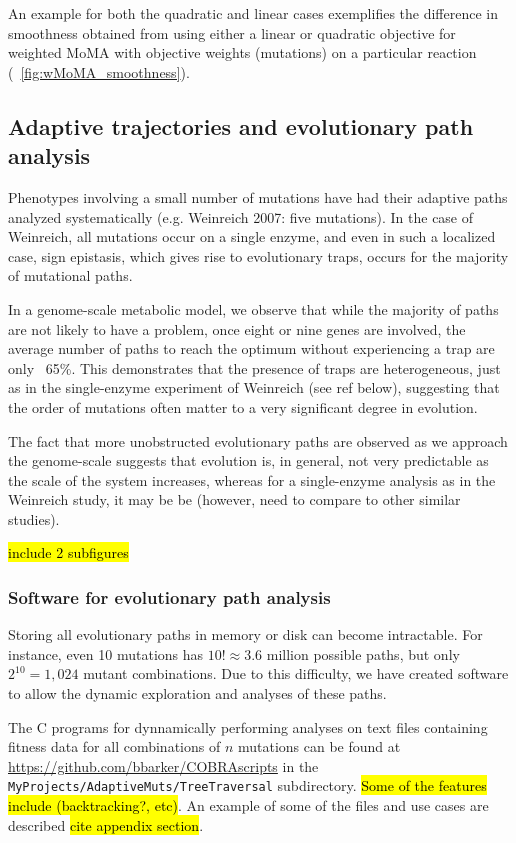 An example for both the quadratic and linear cases exemplifies the
difference in smoothness obtained from using either a linear or
quadratic objective for weighted MoMA with objective weights (mutations)
on a particular reaction (\Fig~\ref{fig:wMoMA_smoothness}).


\subsection{Adaptive trajectories and evolutionary path analysis}

Phenotypes involving a small number of mutations have had their
adaptive paths analyzed systematically (e.g. Weinreich 2007: five
mutations). In the case of Weinreich, all mutations occur on a single
enzyme, and even in such a localized case, sign epistasis, which gives
rise to evolutionary traps, occurs for the majority of mutational
paths.

In a genome-scale metabolic model, we observe that while the majority
of paths are not likely to have a problem, once eight or nine genes are
involved, the average number of paths to reach the optimum without
experiencing a trap are only ~65\%. This demonstrates that the
presence of traps are heterogeneous, just as in the single-enzyme
experiment of Weinreich (see ref below), suggesting that the order of
mutations often matter to a very significant degree in evolution.

The fact that more unobstructed evolutionary paths are observed as we
approach the genome-scale suggests that evolution is, in general, not
very predictable as the scale of the system increases, whereas for a
single-enzyme analysis as in the Weinreich study, it may be be
(however, need to compare to other similar studies).

\hl{include 2 subfigures}

\subsubsection{Software for evolutionary path analysis}

Storing all evolutionary paths in memory or disk can become 
intractable. For instance, even 10 mutations has $10! \approx
3.6$ million possible paths, but only $2^{10} = 1,024$ mutant
combinations. Due to this difficulty, we have created software to allow 
the dynamic exploration and analyses of these paths. 

The C programs for dynnamically performing analyses on text files
containing fitness data for all combinations of $n$ mutations
can be found at \url{https://github.com/bbarker/COBRAscripts}
in the \texttt{MyProjects/AdaptiveMuts/TreeTraversal} subdirectory.
\hl{Some of the features include (backtracking?, etc)}.  An example of
some of the files and use cases are described \hl{cite appendix
section}.

